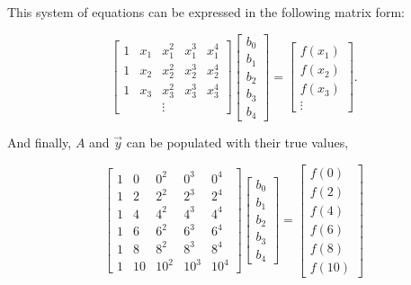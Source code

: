 This system of equations can be expressed in the following matrix form:

\begin{equation} \label{eq:LinAlgSubscript}
\begin{bmatrix}
1 & x_1 & x_1^2 & x_1^3 & x_1^4 \\
1 & x_2 & x_2^2 & x_2^3 & x_2^4 \\
1 & x_3 & x_3^2 & x_3^3 & x_3^4 \\
 & & \vdots & &
\end{bmatrix}
\begin{bmatrix}
b_0 \\
b_1 \\
b_2 \\
b_3 \\
b_4 
\end{bmatrix}
=
\begin{bmatrix}
f(x_1) \\ 
f(x_2) \\
f(x_3) \\ 
\vdots
\end{bmatrix}.
\end{equation}



And finally, $A$ and $\vec{y}$ can be populated with their true values,

\begin{equation} \label{eq:realValues}
\begin{bmatrix}
1 & 0 & 0^2 & 0^3 & 0^4 \\
1 & 2 & 2^2 & 2^3 & 2^4 \\
1 & 4 & 4^2 & 4^3 & 4^4 \\
1 & 6 & 6^2 & 6^3 & 6^4 \\
1 & 8 & 8^2 & 8^3 & 8^4 \\
1 & 10 & 10^2 & 10^3 & 10^4
\end{bmatrix}
\begin{bmatrix}
b_0 \\
b_1 \\
b_2 \\
b_3 \\
b_4 
\end{bmatrix}
=
\begin{bmatrix}
f(0) \\ 
f(2) \\
f(4) \\ 
f(6) \\
f(8) \\
f(10)
\end{bmatrix}
\end{equation}


